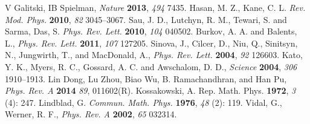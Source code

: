 \documentclass[atoms,article,submit,moreauthors,pdftex,12pt,a4paper]{mdpi}
\begin{document}
\begin{thebibliography}{999}
V Galitski, IB Spielman, {\em Nature} {\bf 2013}, {\em 494} 7435.
Hasan, M. Z., Kane, C. L. {\em Rev. Mod. Phys.} {\bf 2010}, {\em 82} 3045–3067.
Sau, J. D., Lutchyn, R. M., Tewari, S. and Sarma, Das, S. {\em Phys. Rev. Lett.} {\bf 2010}, {\em 104} 040502.
Burkov, A. A. and Balents, L.,  {\em Phys. Rev. Lett.} {\bf 2011}, {\em 107} 127205. 
Sinova, J., Cilcer, D., Niu, Q., Sinitsyn, N., Jungwirth, T., and MacDonald, A.,  {\em Phys. Rev. Lett.} {\bf 2004}, {\em 92} 126603.
Kato, Y. K., Myers, R. C., Gossard, A. C. and Awschalom, D. D.,  {\em Science} {\bf 2004}, {\em 306} 1910–1913.
Lin Dong, Lu Zhou, Biao Wu, B. Ramachandhran, and Han Pu, {\em Phys. Rev. A} {\bf 2014} {\em 89}, 011602(R).
Kossakowski, A. { Rep. Math. Phys.} {\bf 1972}, {\em 3} (4): 247.
Lindblad, G. {\em Commun. Math. Phys.} {\bf 1976}, {\em 48} (2): 119.
Vidal, G., Werner, R. F., {\em Phys. Rev. A} {\bf 2002}, {\em 65} 032314.
\end{thebibliography}
\end{document}
